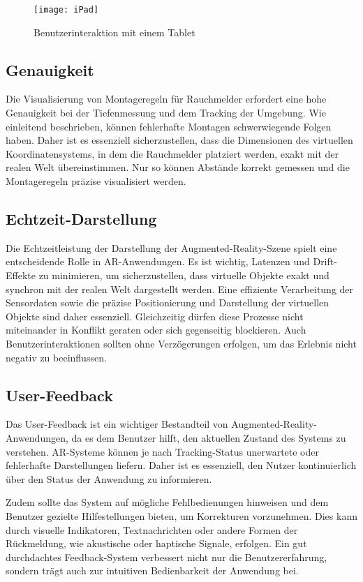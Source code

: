 \begin{figure}[ht]
    \centering
    \texttt{[image: iPad]}
    \caption{Benutzerinteraktion mit einem Tablet}
    \label{fig:ipad}
\end{figure}

\subsection{Genauigkeit}

Die Visualisierung von Montageregeln für Rauchmelder erfordert eine hohe Genauigkeit bei der Tiefenmessung und dem Tracking der Umgebung. Wie einleitend beschrieben, können fehlerhafte Montagen schwerwiegende Folgen haben. Daher ist es essenziell sicherzustellen, dass die Dimensionen des virtuellen Koordinatensystems, in dem die Rauchmelder platziert werden, exakt mit der realen Welt übereinstimmen. Nur so können Abstände korrekt gemessen und die Montageregeln präzise visualisiert werden.

\subsection{Echtzeit-Darstellung}

Die Echtzeitleistung der Darstellung der Augmented-Reality-Szene spielt eine entscheidende Rolle in AR-Anwendungen. Es ist wichtig, Latenzen und Drift-Effekte zu minimieren, um sicherzustellen, dass virtuelle Objekte exakt und synchron mit der realen Welt dargestellt werden. Eine effiziente Verarbeitung der Sensordaten sowie die präzise Positionierung und Darstellung der virtuellen Objekte sind daher essenziell. Gleichzeitig dürfen diese Prozesse nicht miteinander in Konflikt geraten oder sich gegenseitig blockieren. Auch Benutzerinteraktionen sollten ohne Verzögerungen erfolgen, um das Erlebnis nicht negativ zu beeinflussen.

\subsection{User-Feedback}

Das User-Feedback ist ein wichtiger Bestandteil von Augmented-Reality-Anwendungen, da es dem Benutzer hilft, den aktuellen Zustand des Systems zu verstehen. AR-Systeme können je nach Tracking-Status unerwartete oder fehlerhafte Darstellungen liefern. Daher ist es essenziell, den Nutzer kontinuierlich über den Status der Anwendung zu informieren.

Zudem sollte das System auf mögliche Fehlbedienungen hinweisen und dem Benutzer gezielte Hilfestellungen bieten, um Korrekturen vorzunehmen. Dies kann durch visuelle Indikatoren, Textnachrichten oder andere Formen der Rückmeldung, wie akustische oder haptische Signale, erfolgen. Ein gut durchdachtes Feedback-System verbessert nicht nur die Benutzererfahrung, sondern trägt auch zur intuitiven Bedienbarkeit der Anwendung bei.

